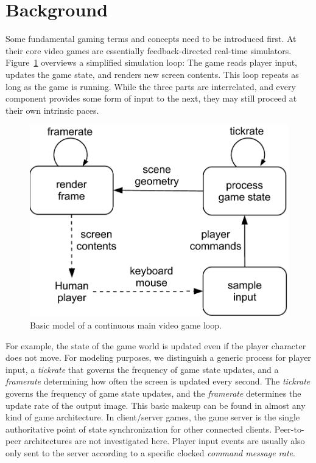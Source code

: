 \section{Background}
\label{sec:background}

Some fundamental gaming terms and concepts need to be introduced first.
At their core video games are essentially feedback-directed real-time simulators. Figure~\ref{fig:gameloop1} overviews a simplified simulation loop: The game reads player input, updates the game state, and renders new screen contents. This loop repeats as long as the game is running. While the three parts are interrelated, and every component provides some form of input to the next, they may still proceed at their own intrinsic paces.


\begin{figure}[!t]
	\centering
	\includegraphics[width=0.8\columnwidth]{../../../models/game_loop.pdf}
	\caption{Basic model of a continuous main video game loop.}
	\label{fig:gameloop1}
\end{figure}

For example, the state of the game world is updated even if the player character does not move. For modeling purposes, we distinguish a generic process for player input, a \textit{tickrate} that governs the frequency of game state updates, and a \textit{framerate} determining how often the screen is updated every second. The \textit{tickrate} governs the frequency of game state updates, and the \textit{framerate} determines the update rate of the output image. This basic makeup can be found in almost any kind of game architecture.
In client/server games, the game server is the single authoritative point of state synchronization for other connected clients. Peer-to-peer architectures are not investigated here. Player input events are usually also only sent to the server according to a specific clocked \textit{command message rate}.

